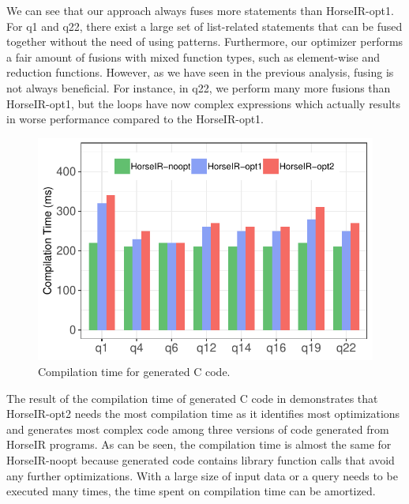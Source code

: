 We can see that our approach always fuses more statements than HorseIR-opt1.
For q1 and q22, there exist a large set of list-related statements that can be
fused together without the need of using patterns.  Furthermore, our optimizer
performs a fair amount of fusions with mixed function types, such as
element-wise and reduction functions.
However, as we have seen in the previous analysis, fusing is not always
beneficial. For instance, in q22, we perform many more fusions than
HorseIR-opt1, but the loops have now complex expressions which actually results
in worse performance compared to the HorseIR-opt1. 

\begin{figure}[htbp]
\centering
\includegraphics[width=.9\columnwidth]{./src/figure/compile-time.pdf}
\caption{Compilation time for generated C code.}
\label{fig:compilation_time}
\end{figure}

The result of the compilation time of generated C code in
 demonstrates that HorseIR-opt2 needs the most
compilation time as it identifies most optimizations and generates most complex
code among three versions of code generated from HorseIR programs.
As can be seen, the compilation time is almost the same for HorseIR-noopt because
generated code contains library function calls that avoid any further optimizations.
With a large size of input data or a query needs to be executed many times,
the time spent on compilation time can be amortized.




